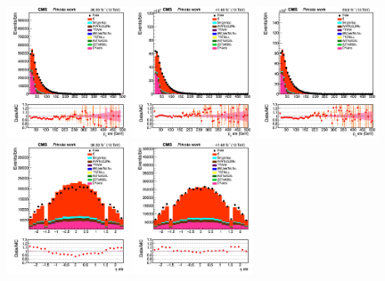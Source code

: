 \documentclass{cernatlasnote}
\begin{document}
  \begin{figure}[htp]
\centering
 \includegraphics[width=0.32\textwidth]{images/emu_channel/2016/16_Range_0pt7_1pt3/subleading_electron_pt_trig_Linear.png}
\includegraphics[width=0.32\textwidth]{images/emu_channel/2017/17_Range_0pt7_1pt3/subleading_electron_pt_trig_Linear.png}
 \includegraphics[width=0.32\textwidth]{images/emu_channel/2018/18_Range_0pt7_1pt3/subleading_electron_pt_trig_Linear.png}\\
 \includegraphics[width=0.32\textwidth]{images/emu_channel/2016/16_Range_0pt7_1pt3/subleading_electron_eta_trig_Linear.png}
\includegraphics[width=0.32\textwidth]{images/emu_channel/2017/17_Range_0pt7_1pt3/subleading_electron_eta_trig_Linear.png}

\end{figure}
\end{document}
